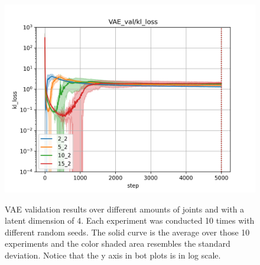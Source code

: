 \begin{figure}[h]
\begin{center}
{        \includegraphics[width=0.31 \linewidth]{figures/experiments/vae_comparison_latent_2_kl_loss.png}
            \label{fig:VAE_latent/kl_2}
            }
        \hfill
        \hfill
    \end{center}
    \caption[VAE validation results, only distance loss and latent = 4]{VAE validation results over different amounts of joints and with a latent dimension of 4. Each experiment was conducted 10 times with different random seeds. The solid curve is the average over those 10 experiments and the color shaded area resembles the standard deviation. Notice that the y axis in bot plots is in log scale.}
    \label{fig:VAE_latent}
\end{figure}

